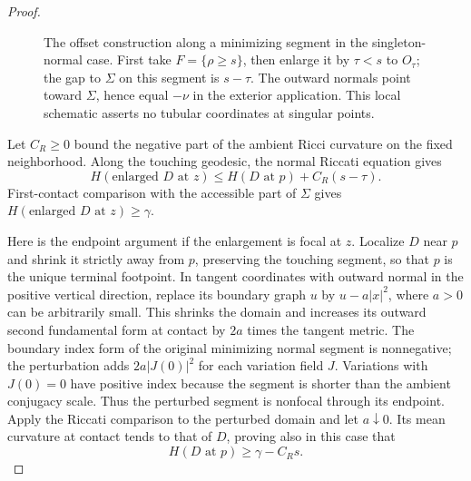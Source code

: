 \begin{proof}
\begin{figure}[tbp]
\centering
{}
\caption{The offset construction along a minimizing segment in the
singleton-normal case. First take $F=\{\rho\ge s\}$, then enlarge it
by $\tau<s$ to $O_\tau$; the gap to $\Sigma$ on this segment is
$s-\tau$. The outward normals point toward $\Sigma$, hence equal
$-\nu$ in the exterior application. This local schematic asserts no
tubular coordinates at singular points.}
\label{fig:rpi:smoothing-offset}
\end{figure}

Let $C_R\ge0$ bound the negative part of the ambient Ricci curvature
on the fixed neighborhood. Along the touching geodesic, the normal
Riccati equation gives
\[
 H(\text{enlarged }D\text{ at }z)
        \le H(D\text{ at }p)+C_R(s-\tau).
\]
First-contact comparison with the accessible part of $\Sigma$ gives
$H(\text{enlarged }D\text{ at }z)\ge\gamma$.

Here is the endpoint argument if the enlargement is focal at $z$.
Localize $D$ near $p$ and shrink it strictly away from $p$, preserving
the touching segment, so that $p$ is the unique terminal footpoint.
In tangent coordinates with outward normal in the positive vertical
direction, replace its boundary graph $u$ by
$u-a|x|^2$, where $a>0$ can be arbitrarily small. This shrinks the
domain and increases its outward second fundamental form at contact
by $2a$ times the tangent metric. The boundary index form of the
original minimizing normal segment is nonnegative; the perturbation
adds $2a|J(0)|^2$ for each variation field $J$. Variations with
$J(0)=0$ have positive index because the segment is shorter than
the ambient conjugacy scale. Thus the perturbed segment is nonfocal
through its endpoint. Apply the Riccati comparison to the perturbed
domain and let $a\downarrow0$. Its mean curvature at contact tends
to that of $D$, proving also in this case that
\[
 H(D\text{ at }p)\ge\gamma-C_Rs.
\]


\end{proof}
